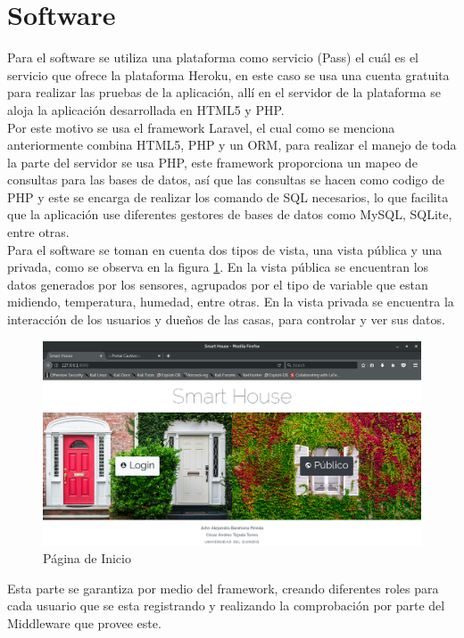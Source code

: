 \section{Software}

Para el software se utiliza una plataforma como servicio (Pass) el cuál es el servicio que ofrece la plataforma Heroku, en este caso se usa una cuenta gratuita para realizar las pruebas de la aplicación, allí en el servidor de la plataforma se aloja la aplicación desarrollada en HTML5 y PHP.\\

Por este motivo se usa el framework Laravel, el cual como se menciona anteriormente combina HTML5, PHP y un ORM, para realizar el manejo de toda la parte del servidor se usa PHP, este framework proporciona un mapeo de consultas para las bases de datos, así que las consultas se hacen como codigo de PHP y este se encarga de realizar los comando de SQL necesarios, lo que facilita que la aplicación use diferentes gestores de bases de datos como MySQL, SQLite, entre otras.\\

Para el software se toman en cuenta dos tipos de vista, una vista pública y una privada, como se observa en la figura \ref{fig:index}. En la vista pública se encuentran los datos generados por los sensores, agrupados por el tipo de variable que estan midiendo, temperatura, humedad, entre otras. En la vista privada se encuentra la interacción de los usuarios y dueños de las casas, para controlar y ver sus datos.\\

\begin{figure}
	\centering
	\caption{Página de Inicio}
	\label{fig:index}
	\includegraphics[width=0.9\linewidth]{Imagenes/Index}
\end{figure}


Esta parte se garantiza por medio del framework, creando diferentes roles para cada usuario que se esta registrando y realizando la comprobación por parte del Middleware que provee este.\\

